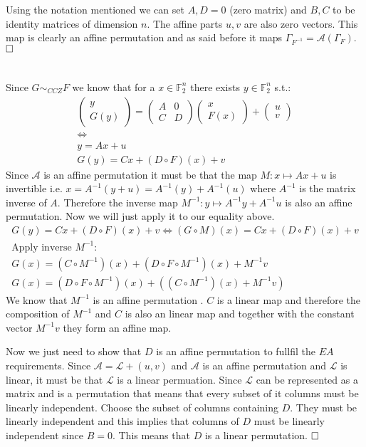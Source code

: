 \documentclass[12pt, a4paper]{article}
\newcommand{\qed}{\hfill\square}
\begin{document}
Using the notation mentioned we can set $A,D = 0$ (zero matrix) and $B,C$ to be identity matrices of dimension $n$. The affine parts $u,v$ are also zero vectors. This map is clearly an affine permutation and as said before it maps $\Gamma_{F^{-1}} = \mathcal{A}(\Gamma_F)$.
$\qed$

\section{}
Since $G \sim_{CCZ} F$ we know that for a $x \in \mathbb{F}_2^n$ there exists $y \in \mathbb{F}_2^n$ s.t.:
\begin{gather*}
\begin{pmatrix}
y\\
G(y)
\end{pmatrix}
= \begin{pmatrix}
A & 0\\
C & D
\end{pmatrix}
\begin{pmatrix}
x\\
F(x)
\end{pmatrix}
+ \begin{pmatrix}
u\\
v
\end{pmatrix}
\\
\iff\\
y = Ax + u\\
G(y) = Cx + (D \circ F)(x) + v
\end{gather*}
Since $\mathcal{A}$ is an affine permutation it must be that the map $M: x \mapsto Ax+u$ is invertible i.e. $x = A^{-1}(y+u) = A^{-1}(y)+A^{-1}(u)$ where $A^{-1}$ is the matrix inverse of $A$. Therefore the inverse map $M^{-1}: y \mapsto A^{-1}y + A^{-1}u$ is also an affine permutation. Now we will just apply it to our equality above.
\begin{gather*}
G(y) = Cx + (D \circ F)(x) + v \iff (G \circ M)(x) = Cx + (D \circ F)(x) + v\\
\text{Apply inverse $M^{-1}$:}\\
G(x) = (C \circ M^{-1})(x) + (D \circ F \circ M^{-1})(x) + M^{-1}v\\
G(x) = (D \circ F \circ M^{-1})(x) + ((C \circ M^{-1})(x) + M^{-1}v)
\end{gather*}
We know that $M^{-1}$ is an affine permutation . $C$ is a linear map and therefore the composition of $M^{-1}$ and $C$ is also an linear map and together with the constant vector $M^{-1}v$ they form an affine map. 

Now we just need to show that $D$ is an affine permutation to fullfil the $EA$ requirements. Since $\mathcal{A} = \mathcal{L} + (u,v)$ and $\mathcal{A}$ is an affine permutation and $\mathcal{L}$ is linear, it must be that $\mathcal{L}$ is a linear permuation. Since $\mathcal{L}$ can be represented as a matrix and is a permutation that means that every subset of it columns must be linearly independent. Choose the subset of columns containing $D$. They must be linearly independent and this implies that columns of $D$ must be linearly independent since $B = 0$. This means that $D$ is a linear permutation.
$\qed$
\end{document}
